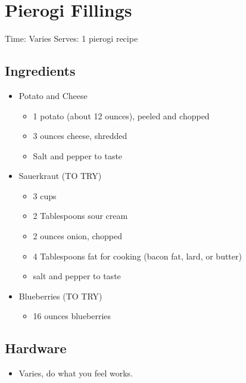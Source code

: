 \section{Pierogi Fillings}
\label{pierogiFillings}
\setcounter{secnumdepth}{0}
Time: Varies
Serves: 1 pierogi recipe

\begin{multicols}{2}
\subsection*{Ingredients}
\begin{itemize}
    \item Potato and Cheese
    \begin{itemize}
        \item 1 potato (about 12 ounces), peeled and chopped
        \item 3 ounces cheese, shredded
        \item Salt and pepper to taste
    \end{itemize}
    \item Sauerkraut (TO TRY)
    \begin{itemize}
        \item 3 cups 
        \item 2 Tablespoons sour cream
        \item 2 ounces onion, chopped
        \item 4 Tablespoons fat for cooking (bacon fat, lard, or butter)
        \item salt and pepper to taste
    \end{itemize}
    \item Blueberries (TO TRY)
    \begin{itemize}
        \item 16 ounces blueberries
    \end{itemize}
\end{itemize}

\subsection*{Hardware}
\begin{itemize}
    \item Varies, do what you feel works.
\end{itemize}
\clearpage


\end{multicols}
